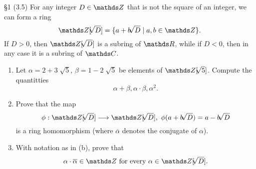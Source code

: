 \documentclass{homework}
\begin{document}
\begin{problem}{\S 1}
  (3.5) For any integer $D\in \Z$ that is not the square of an integer, we can form a ring \[
    \Z[\sqrt[]{D} ]=\{a+b\sqrt[]{D} \mid a,b\in \Z\} 
  .\] If $D>0$, then $\Z[\sqrt[]{D} ]$ is a subring of $\R$, while if $D<0$, then in any case it is
  a subring of $\C$.
  \begin{enumerate}[label=(\alph*)]
    \item Let $ \alpha=2+3\sqrt[]{5} $, $\beta=1-2\sqrt[]{5} $ be elements of $\Z[\sqrt[]{5} ]$.
      Compute the quantitties \[
        \alpha+\beta,\alpha\cdot \beta,\alpha^2
      .\] 
    \item Prove that the map \[
        \phi: \Z[\sqrt[]{D} ] \longrightarrow \Z[\sqrt[]{D} ],\ \phi(a+b\sqrt[]{D} )=a-b\sqrt[]{D} 
      \] is a ring homomorphism (where $\overline{\alpha}$ denotes the conjugate of $ \alpha$).
    \item With notation as in (b), prove that \[
        \alpha\cdot \overline{\alpha}\in \Z ~\text{for every}~ \alpha\in \Z[\sqrt[]{D} ]
    .\] 
  \end{enumerate}
\end{problem}
\end{document}
